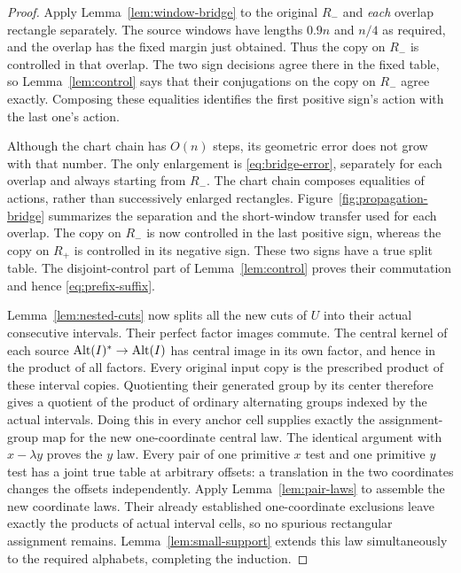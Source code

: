 \begin{proof}
Apply Lemma~\ref{lem:window-bridge} to the original $R_-$ and
\emph{each} overlap rectangle separately.  The source windows
have lengths $0.9n$ and $n/4$ as required, and the overlap has
the fixed margin just obtained.  Thus the copy on $R_-$ is
controlled in that overlap.  The two sign decisions agree there
in the fixed table, so Lemma~\ref{lem:control} says that their
conjugations on the copy on $R_-$ agree exactly.  Composing
these equalities identifies the first positive sign's action
with the last one's action.

Although the chart chain has $O(n)$ steps, its geometric error
does not grow with that number.  The only enlargement is
\eqref{eq:bridge-error}, separately for each overlap and always
starting from $R_-$.  The chart chain composes equalities of
actions, rather than successively enlarged rectangles.
Figure~\ref{fig:propagation-bridge} summarizes the separation and
the short-window transfer used for each overlap.
The copy on $R_-$ is now controlled in the last positive sign,
whereas the copy on $R_+$ is controlled in its negative sign.
These two signs have a true split table.  The disjoint-control
part of Lemma~\ref{lem:control} proves their commutation and
hence \eqref{eq:prefix-suffix}.

Lemma~\ref{lem:nested-cuts} now splits all the new cuts of $U$
into their actual consecutive intervals.  Their perfect factor images
commute.  The central kernel of each source
$\operatorname{Alt}(I)^\ast\to\operatorname{Alt}(I)$ has central image in its own factor,
and hence in the product of all factors.  Every original input copy
is the prescribed product of these interval copies.  Quotienting their
generated group by its center therefore gives a quotient of the product
of ordinary alternating groups indexed by the actual intervals.
Doing this in every anchor cell supplies exactly the assignment-group
map for the new one-coordinate central law.  The identical
argument with $x-\lambda y$ proves the $y$ law.  Every pair of
one primitive $x$ test and one primitive $y$ test has a joint
true table at arbitrary offsets: a translation in the two
coordinates changes the offsets independently.  Apply
Lemma~\ref{lem:pair-laws} to assemble the new coordinate laws.
Their already established one-coordinate exclusions leave
exactly the products of actual interval cells, so no spurious
rectangular assignment remains.  Lemma~\ref{lem:small-support}
extends this law simultaneously to the required alphabets,
completing the induction.
\end{proof}


